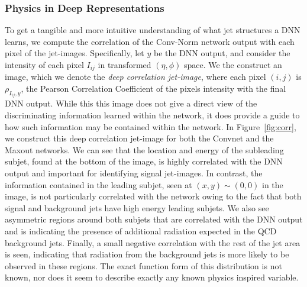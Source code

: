 \subsubsection{Physics in Deep Representations} %
\label{ssub:physics_in_deep_representations}
To get a tangible and more intuitive understanding of what jet structures a DNN learns, we compute the correlation of the Conv-Norm network output with each pixel of the jet-images. Specifically, let $y$ be the DNN output, and consider the intensity of each pixel $I_{ij}$ in transformed $(\eta, \phi)$ space. We the construct an image, which we denote the \emph{deep correlation jet-image}, where each pixel $(i, j)$ is $\rho_{I_{ij}, y}$, the Pearson Correlation Coefficient of the pixels intensity with the final DNN output. While this this image does not give a direct view of the discriminating information learned within the network, it does provide a guide to how such information may be contained within the network.  In Figure~\ref{fig:corr}, we construct this deep correlation jet-image for both the Convnet and the Maxout networks.  We can see that the location and energy of the subleading subjet, found at the bottom of the image, is highly correlated with the DNN output and important for identifying signal jet-images.  In contrast, the information contained in the leading subjet, seen at $(x,y)\sim (0,0)$ in the image, is not particularly correlated with the network owing to the fact that both signal and background jets have high energy leading subjets.  We also see asymmetric regions around both subjets that are correlated with the DNN output and is indicating the presence of additional radiation expected in the QCD background jets.  Finally, a small negative correlation with the rest of the jet area is seen, indicating that radiation from the background jets is more likely to be observed in these regions.   The exact function form of this distribution is not known, nor does it seem to describe exactly any known physics inspired variable.
